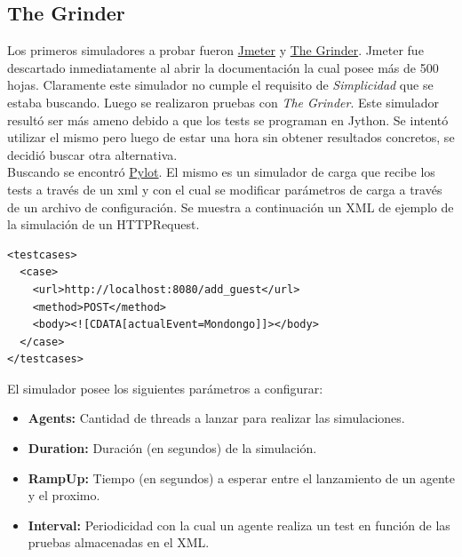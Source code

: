 \documentclass[a4paper,10pt]{article}
\begin{document}
        \subsection{The Grinder}
            \begin{itemize}
            \end{itemize}

        Los primeros simuladores a probar fueron \href{http://http://jmeter.apache.org}{Jmeter} y 
        \href{http://grinder.sourceforge.net}{The Grinder}. Jmeter fue descartado inmediatamente al abrir la 
        documentación la cual posee más de 500 hojas. Claramente este simulador no cumple el requisito de 
        \textit{Simplicidad} que se estaba buscando. Luego se realizaron pruebas con \textit{The Grinder}. Este 
        simulador resultó ser más ameno debido a que los tests se programan en Jython. Se intentó utilizar el
        mismo pero luego de estar una hora sin obtener resultados concretos, se decidió buscar otra alternativa. \\
        \indent Buscando se encontró \href{http://www.pylot.org/}{Pylot}. El mismo es un simulador de carga que 
        recibe los tests a través de un xml y con el cual se modificar parámetros de carga a través de un 
        archivo de configuración. Se muestra a continuación un XML de ejemplo de la simulación de un HTTPRequest. 

        \vspace{1cm}
        \lstset{language=XML}
        \begin{lstlisting}
<testcases>
  <case>
    <url>http://localhost:8080/add_guest</url>
    <method>POST</method>
    <body><![CDATA[actualEvent=Mondongo]]></body>
  </case>
</testcases>
        \end{lstlisting}

        \vspace{1cm}
        \noindent El simulador posee los siguientes parámetros a configurar:
        \begin{itemize}
            \item \textbf{Agents:} Cantidad de threads a lanzar para realizar las simulaciones.
            \item \textbf{Duration:} Duración (en segundos) de la simulación.
            \item \textbf{RampUp:} Tiempo (en segundos) a esperar entre el lanzamiento de un agente y el proximo.
            \item \textbf{Interval:} Periodicidad con la cual un agente realiza un test en función de las pruebas
            almacenadas en el XML.
        \end{itemize}
\end{document}
